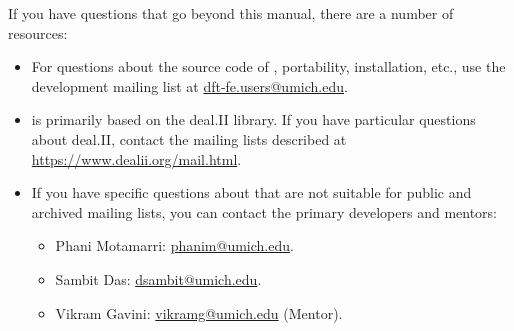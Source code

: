 If you have questions that go beyond this manual, there are a number of
resources:
\begin{itemize}
\item For questions about the source code of \dftfe{}, portability, installation,
  etc., use the \dftfe{} development mailing list at
  \url{dft-fe.users@umich.edu}.

\item \dftfe{} is primarily based on the deal.II library. If you have particular questions
  about deal.II, contact
  the mailing lists described at \url{https://www.dealii.org/mail.html}.

\item If you have specific questions about \dftfe{} that are not suitable
  for public and archived mailing lists, you can contact the
  primary developers and mentors:
  \begin{itemize}
  \item Phani Motamarri: \url{phanim@umich.edu}.
  \item Sambit Das: \url{dsambit@umich.edu}.
  \item Vikram Gavini: \url{vikramg@umich.edu} (Mentor).
  \end{itemize}
\end{itemize}
